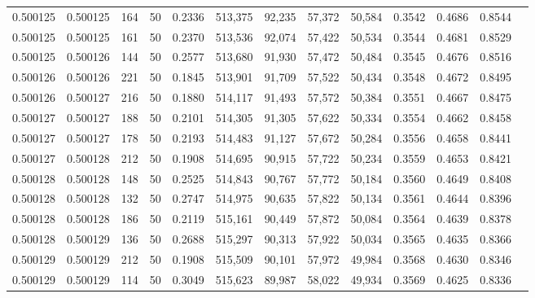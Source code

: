 \begin{tabular}{rrrrrrrrrrrrr}
0.500125 & 0.500125 &   164 &  50 &                                     0.2336 & 513,375 &  92,235 &  57,372 &  50,584 & 0.3542 & 0.4686 & 0.8544 \\
0.500125 & 0.500125 &   161 &  50 &                                     0.2370 & 513,536 &  92,074 &  57,422 &  50,534 & 0.3544 & 0.4681 & 0.8529 \\
0.500125 & 0.500126 &   144 &  50 &                                     0.2577 & 513,680 &  91,930 &  57,472 &  50,484 & 0.3545 & 0.4676 & 0.8516 \\
0.500126 & 0.500126 &   221 &  50 &                                     0.1845 & 513,901 &  91,709 &  57,522 &  50,434 & 0.3548 & 0.4672 & 0.8495 \\
0.500126 & 0.500127 &   216 &  50 &                                     0.1880 & 514,117 &  91,493 &  57,572 &  50,384 & 0.3551 & 0.4667 & 0.8475 \\
0.500127 & 0.500127 &   188 &  50 &                                     0.2101 & 514,305 &  91,305 &  57,622 &  50,334 & 0.3554 & 0.4662 & 0.8458 \\
0.500127 & 0.500127 &   178 &  50 &                                     0.2193 & 514,483 &  91,127 &  57,672 &  50,284 & 0.3556 & 0.4658 & 0.8441 \\
0.500127 & 0.500128 &   212 &  50 &                                     0.1908 & 514,695 &  90,915 &  57,722 &  50,234 & 0.3559 & 0.4653 & 0.8421 \\
0.500128 & 0.500128 &   148 &  50 &                                     0.2525 & 514,843 &  90,767 &  57,772 &  50,184 & 0.3560 & 0.4649 & 0.8408 \\
0.500128 & 0.500128 &   132 &  50 &                                     0.2747 & 514,975 &  90,635 &  57,822 &  50,134 & 0.3561 & 0.4644 & 0.8396 \\
0.500128 & 0.500128 &   186 &  50 &                                     0.2119 & 515,161 &  90,449 &  57,872 &  50,084 & 0.3564 & 0.4639 & 0.8378 \\
0.500128 & 0.500129 &   136 &  50 &                                     0.2688 & 515,297 &  90,313 &  57,922 &  50,034 & 0.3565 & 0.4635 & 0.8366 \\
0.500129 & 0.500129 &   212 &  50 &                                     0.1908 & 515,509 &  90,101 &  57,972 &  49,984 & 0.3568 & 0.4630 & 0.8346 \\
0.500129 & 0.500129 &   114 &  50 &                                     0.3049 & 515,623 &  89,987 &  58,022 &  49,934 & 0.3569 & 0.4625 & 0.8336 \\

\end{tabular}
